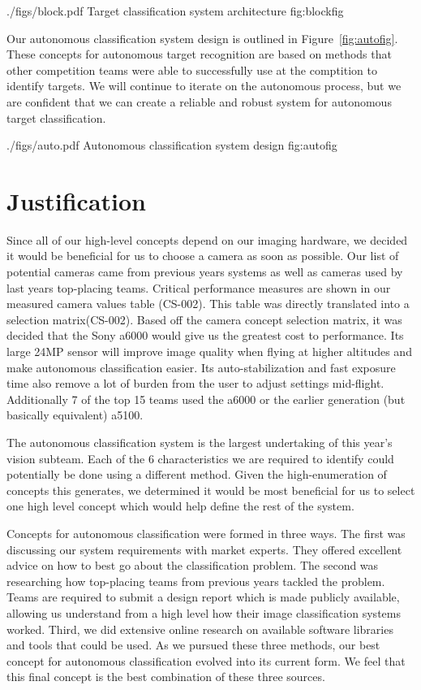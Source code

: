 \documentclass[]{auvsi_doc}
\begin{document}
\AUVSIFigure
{./figs/block.pdf}
{\textwidth}
{Target classification system architecture}
{fig:blockfig}

Our autonomous classification system design is outlined in Figure~\ref{fig:autofig}.
These concepts for autonomous target recognition are based on methods that
other competition teams were able to successfully use at the comptition to
identify targets. We will continue to iterate on the autonomous process, but
we are confident that we can create a reliable and robust system for autonomous
target classification.

\AUVSIFigure
{./figs/auto.pdf}
{\textwidth}
{Autonomous classification system design}
{fig:autofig}

\section{Justification}

Since all of our high-level concepts depend on our imaging hardware, we decided it would be beneficial for us to choose a camera as 
soon as possible. Our list of potential cameras came from previous years systems as well as cameras used by last years top-placing 
teams. Critical performance measures are shown in our measured camera values table (CS-002). This table was directly translated 
into a selection matrix(CS-002). Based off the camera concept selection matrix, it was decided that the Sony a6000 would give us 
the greatest cost to performance. Its large 24MP sensor will improve image quality when flying at higher altitudes and make 
autonomous classification easier. Its auto-stabilization and fast exposure time also remove a lot of burden from the user to adjust 
settings mid-flight. Additionally 7 of the top 15 teams used the a6000 or the earlier generation (but basically equivalent) a5100.

The autonomous classification system is the largest undertaking of this year's vision subteam. Each of the 6 characteristics we are 
required to identify could potentially be done using a different method. Given the high-enumeration of concepts this generates, we 
determined it would be most beneficial for us to select one high level concept which would help define the rest of the system.

Concepts for autonomous classification were formed in three ways. The first was discussing our system requirements with market experts. 
They offered excellent advice on how to best go about the classification problem. The second was researching how top-placing teams from 
previous years tackled the problem. Teams are required to submit a design report which is made publicly available, allowing us understand 
from a high level how their image classification systems worked. Third, we did extensive online research on available software libraries 
and tools that could be used. As we pursued these three methods, our best concept for autonomous classification evolved into its current 
form. We feel that this final concept is the best combination of these three sources.
\end{document}
